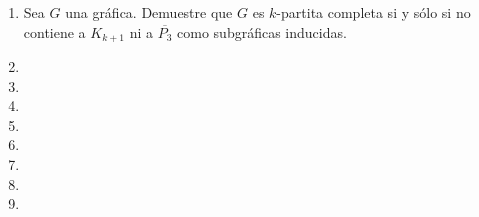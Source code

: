 \documentclass{article}
\begin{document}
\begin{enumerate}
\begin{proof}
    \textcolor{blue}{Caso 2:} Si $G$ es un \'arbol, esto nos indica que $G$ es
    $1-$conexa, y es por eso que se considera este caso como el m\'inimo para el
    que se cumplir\'a la condici\'on a demostrar. Sabemos por el teorema de
    caracterizaci\'on de \'arboles que cada arista en $G$ ser\'a un puente, y
    por el resultado previamente mostrado sabemos que existe una trayectoria $T$
    en $G$ de orden exactamente $3$, as\'i $T$ es claramente $P_3$ y concluimos
    $P_3$ es subg\'afica inducida de $G$.
    
    De los casos anteriores concluimos que el enunciado es verdadero.
  \end{proof}
  
\item {} Sea $G$ una gr\'afica. Demuestre que $G$
  es $k$-partita completa si y s\'olo si no contiene a $K_{k+1}$ ni a $\overline{P_3}$
  como subgr\'aficas inducidas.
  
\item
\item
\item
\item
\item
\item
\item
\item
\end{enumerate}
\end{document}
